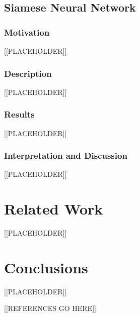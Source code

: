 \documentclass{article}
\begin{document}
\subsection{Siamese Neural Network}

\subsubsection{\textbf{Motivation}}

[[PLACEHOLDER]]

\subsubsection{\textbf{Description}}

[[PLACEHOLDER]]

\subsubsection{\textbf{Results}}

[[PLACEHOLDER]]

\subsubsection{\textbf{Interpretation and Discussion}}

[[PLACEHOLDER]]

\section{Related Work}

[[PLACEHOLDER]]

\section{Conclusions}
\label{sec:conclusions}

[[PLACEHOLDER]]

[[REFERENCES GO HERE]]

%
%
\end{document}
